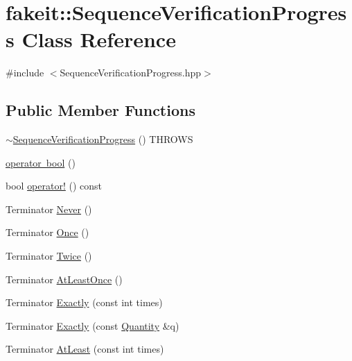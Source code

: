 \hypertarget{classfakeit_1_1SequenceVerificationProgress}{}\section{fakeit\+::Sequence\+Verification\+Progress Class Reference}
\label{classfakeit_1_1SequenceVerificationProgress}


{\ttfamily \#include $<$Sequence\+Verification\+Progress.\+hpp$>$}

\subsection*{Public Member Functions}
\begin{DoxyCompactItemize}
\item 
\mbox{\hyperlink{classfakeit_1_1SequenceVerificationProgress_a2c3325aa3d50002ef448d31e21494f76}{$\sim$\+Sequence\+Verification\+Progress}} () T\+H\+R\+O\+WS
\item 
\mbox{\hyperlink{classfakeit_1_1SequenceVerificationProgress_a462f6bec1f00814e918f9be6bd5f84e6}{operator bool}} ()
\item 
bool \mbox{\hyperlink{classfakeit_1_1SequenceVerificationProgress_a43f9268650854f97cbae3b28487c2be0}{operator!}} () const
\item 
Terminator \mbox{\hyperlink{classfakeit_1_1SequenceVerificationProgress_ad71678d34cb297945ecad2e1fe825f31}{Never}} ()
\item 
Terminator \mbox{\hyperlink{classfakeit_1_1SequenceVerificationProgress_a4a3260eb1380fcee1c0d8ae162ea57f4}{Once}} ()
\item 
Terminator \mbox{\hyperlink{classfakeit_1_1SequenceVerificationProgress_ac453e14db60c17c23748cc5f4f2325ca}{Twice}} ()
\item 
Terminator \mbox{\hyperlink{classfakeit_1_1SequenceVerificationProgress_a682eed8897bda26aa2927f0a0b03f0b1}{At\+Least\+Once}} ()
\item 
Terminator \mbox{\hyperlink{classfakeit_1_1SequenceVerificationProgress_a74c04958c69e3c977ce873de3787305d}{Exactly}} (const int times)
\item 
Terminator \mbox{\hyperlink{classfakeit_1_1SequenceVerificationProgress_abb39ac5b5e16e07b1caaf01325228c47}{Exactly}} (const \mbox{\hyperlink{structfakeit_1_1Quantity}{Quantity}} \&q)
\item 
Terminator \mbox{\hyperlink{classfakeit_1_1SequenceVerificationProgress_a83ba8d481bb79dad783f9bc821dd650e}{At\+Least}} (const int times)

\end{DoxyCompactItemize}
